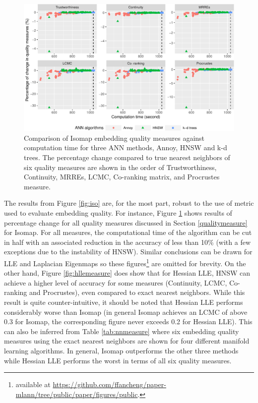 \documentclass[12pt]{article}
\begin{document}
\begin{figure}

{\centering \includegraphics[width=1\linewidth]{mlann_jcgs_files/figure-latex/iso6measure-1} 

}

\caption{Comparison of Isomap embedding quality measures against computation time for three ANN methods, Annoy, HNSW and k-d trees. The percentage change compared to true nearest neighbors of six quality measures are shown in the order of Trustworthiness, Continuity, MRREs, LCMC, Co-ranking matrix, and Procrustes measure. }\label{fig:iso6measure}
\end{figure}

The results from Figure \ref{fig:iso} are, for the most part, robust to the use of metric used to evaluate embedding quality. For instance, Figure \ref{fig:iso6measure} shows results of percentage change for all quality measures discussed in Section \ref{qualitymeasure} for Isomap. For all measures, the computational time of the algorithm can be cut in half with an associated reduction in the accuracy of less than 10\% (with a few exceptions due to the instability of HNSW). Similar conclusions can be drawn for LLE and Laplacian Eigenmaps so these figures\footnote{available at \url{https://github.com/ffancheng/paper-mlann/tree/public/paper/figures/public}.} are omitted for brevity.
On the other hand, Figure \ref{fig:hllemeasure} does show that for Hessian LLE, HNSW can achieve a higher level of accuracy for some measures (Continuity, LCMC, Co-ranking and Procrustes), even compared to exact nearest neighbors. While this result is quite counter-intuitive, it should be noted that Hessian LLE performs considerably worse than Isomap (in general Isomap achieves an LCMC of above 0.3 for Isomap, the corresponding figure never exceeds 0.2 for Hessian LLE).
This can also be inferred from Table \ref{tab:nnmeasure} where six embedding quality measures using the exact nearest neighbors are shown for four different manifold learning algorithms. In general, Isomap outperforms the other three methods while Hessian LLE performs the worst in terms of all six quality measures.
\end{document}
